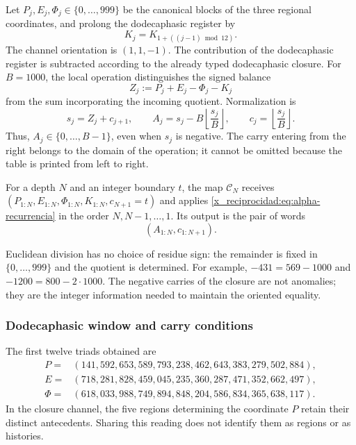Let \(P_j,E_j,\Phi_j\in\{0,\ldots,999\}\) be the canonical blocks of
the three regional coordinates, and prolong the dodecaphasic register by
\[
 K_j=K_{1+((j-1)\bmod12)}.
\]
The channel orientation is \((1,1,-1)\). The contribution of the dodecaphasic register is
subtracted according to the already typed dodecaphasic closure. For \(B=1000\), the
local operation distinguishes the signed balance
\[
 Z_j:=P_j+E_j-\Phi_j-K_j
\]
from the sum incorporating the incoming quotient. Normalization is
\begin{equation}
 s_j=Z_j+c_{j+1},\qquad
 A_j=s_j-B\left\lfloor\frac{s_j}{B}\right\rfloor,
 \qquad c_j=\left\lfloor\frac{s_j}{B}\right\rfloor.
 \label{x_reciprocidad:eq:alpha-recurrencia}
\end{equation}
Thus, \(A_j\in\{0,\ldots,B-1\}\), even when \(s_j\) is
negative. The carry entering from the right belongs to the domain of
the operation; it cannot be omitted because the table is printed from left
to right.

\begin{definition}
\label{x_reciprocidad:def:alpha-finita}
For a depth \(N\) and an integer boundary \(t\), the map
\(\mathcal C_N\) receives
\((P_{1:N},E_{1:N},\Phi_{1:N},K_{1:N},c_{N+1}=t)\) and applies
\eqref{x_reciprocidad:eq:alpha-recurrencia} in the order \(N,N-1,\ldots,1\). Its output
is the pair of words
\[
 (A_{1:N},c_{1:N+1}).
\]
\end{definition}

Euclidean division has no choice of residue sign: the remainder is
fixed in \(\{0,\ldots,999\}\) and the quotient is determined. For
example, \(-431=569-1000\) and \(-1200=800-2\cdot1000\). The
negative carries of the closure are not anomalies; they are the integer
information needed to maintain the oriented equality.

\subsubsection{Dodecaphasic window and carry conditions}
\label{x_reciprocidad:subsec:alpha-ventana}

The first twelve triads obtained are
\begin{align*}
 P={}&(141,592,653,589,793,238,462,643,383,279,502,884),\\
 E={}&(718,281,828,459,045,235,360,287,471,352,662,497),\\
 \Phi={}&(618,033,988,749,894,848,204,586,834,365,638,117).
\end{align*}
In the closure channel, the five regions determining the coordinate
\(P\) retain their distinct antecedents. Sharing this reading does not
identify them as regions or as histories.

